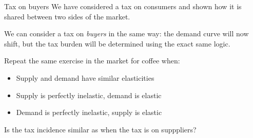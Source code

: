 \documentclass[aspectratio=169]{beamer}
\begin{document}
\begin{frame}{Tax on buyers}
    We have considered a tax on consumers and shown how it is shared between two sides of the market.

    \vspace{5mm}

    We can consider a tax on \textit{buyers} in the same way: the demand curve will now shift, but the tax burden will be determined using the exact same logic.

    \vspace{5mm}

    Repeat the same exercise in the market for coffee when:
    \begin{itemize}
        \item Supply and demand have similar elasticities
        \item Supply is perfectly inelastic, demand is elastic
        \item Demand is perfectly inelastic, supply is elastic
    \end{itemize}
    Is the tax incidence similar as when the tax is on supppliers?
\end{frame}
\end{document}
